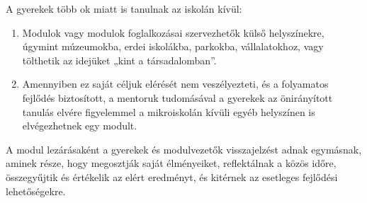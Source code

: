 A gyerekek több ok miatt is tanulnak az iskolán kívül:

\begin{enumerate}
      \item Modulok vagy modulok foglalkozásai szervezhetők külső helyszínekre, úgymint múzeumokba, erdei iskolákba, parkokba, vállalatokhoz, vagy tölthetik az idejüket „kint a társadalomban''.

      \item Amennyiben ez saját céljuk elérését nem veszélyezteti, és a folyamatos fejlődés biztosított, a mentoruk tudomásával a gyerekek az önirányított tanulás elvére figyelemmel a mikroiskolán kívüli egyéb helyszínen is elvégezhetnek egy modult.
\end{enumerate}

A modul lezárásaként a gyerekek és modulvezetők visszajelzést adnak egymásnak, aminek része, hogy megosztják saját élményeiket, reflektálnak a közös időre, összegyűjtik és értékelik az elért eredményt, és kitérnek az esetleges fejlődési lehetőségekre.
